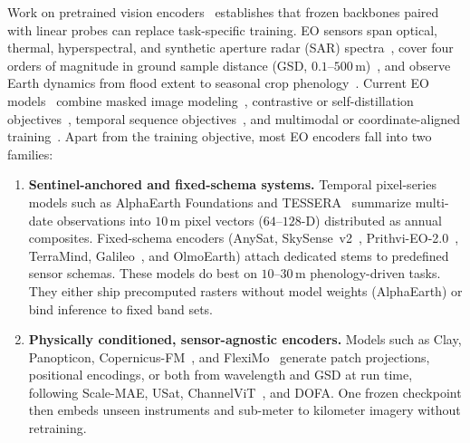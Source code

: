 Work on pretrained vision encoders~\cite{he2022mae,oquab2024dinov2} establishes that frozen backbones paired with linear probes can replace task-specific training. EO sensors span optical, thermal, hyperspectral, and synthetic aperture radar (SAR) spectra~\cite{hong2024spectralgpt,braham2025spectralearth}, cover four orders of magnitude in ground sample distance (GSD, $0.1\text{--}500\,\text{m}$)~\cite{reed2023scalemae,irvin2023usat}, and observe Earth dynamics from flood extent to seasonal crop phenology~\cite{manas2021seco,cong2022satmae}. Current EO models~\cite{zhu2026foundations,stewart2026earthembeddings} combine masked image modeling~\cite{jakubik2023prithvi,xiong2024dofa}, contrastive or self-distillation objectives~\cite{fuller2023croma,waldmann2025panopticon}, temporal sequence objectives~\cite{tseng2023presto,astruc2025anysat}, and multimodal or coordinate-aligned training~\cite{jakubik2025terramind,klemmer2025satclip}. Apart from the training objective, most EO encoders fall into two families:
\begin{enumerate}
  \item \textbf{Sentinel-anchored and fixed-schema systems.} Temporal pixel-series models such as AlphaEarth Foundations and TESSERA~\cite{feng2026tessera} summarize multi-date observations into $10\,\text{m}$ pixel vectors ($64\text{--}128\text{-D}$) distributed as annual composites. Fixed-schema encoders (AnySat, SkySense~v2~\cite{zhang2025skysensev2}, Prithvi-EO-2.0~\cite{szwarcman2026prithvi2}, TerraMind, Galileo~\cite{tseng2025galileo}, and OlmoEarth) attach dedicated stems to predefined sensor schemas. These models do best on $10\text{--}30\,\text{m}$ phenology-driven tasks. They either ship precomputed rasters without model weights (AlphaEarth) or bind inference to fixed band sets.
  \item \textbf{Physically conditioned, sensor-agnostic encoders.} Models such as Clay, Panopticon, Copernicus-FM~\cite{wang2025copernicusfm}, and FlexiMo~\cite{li2026fleximo} generate patch projections, positional encodings, or both from wavelength and GSD at run time, following Scale-MAE, USat, ChannelViT~\cite{bao2024channelvit}, and DOFA. One frozen checkpoint then embeds unseen instruments and sub-meter to kilometer imagery without retraining.
\end{enumerate}
